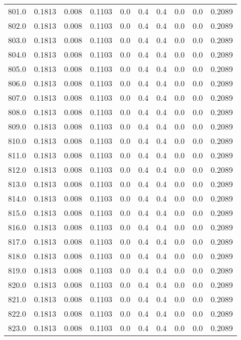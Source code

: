 \begin{longtable}{lrrrrrrrrr}
801.0 & 0.1813 & 0.008 & 0.1103 & 0.0 & 0.4 & 0.4 & 0.0 & 0.0 & 0.2089 \\
802.0 & 0.1813 & 0.008 & 0.1103 & 0.0 & 0.4 & 0.4 & 0.0 & 0.0 & 0.2089 \\
803.0 & 0.1813 & 0.008 & 0.1103 & 0.0 & 0.4 & 0.4 & 0.0 & 0.0 & 0.2089 \\
804.0 & 0.1813 & 0.008 & 0.1103 & 0.0 & 0.4 & 0.4 & 0.0 & 0.0 & 0.2089 \\
805.0 & 0.1813 & 0.008 & 0.1103 & 0.0 & 0.4 & 0.4 & 0.0 & 0.0 & 0.2089 \\
806.0 & 0.1813 & 0.008 & 0.1103 & 0.0 & 0.4 & 0.4 & 0.0 & 0.0 & 0.2089 \\
807.0 & 0.1813 & 0.008 & 0.1103 & 0.0 & 0.4 & 0.4 & 0.0 & 0.0 & 0.2089 \\
808.0 & 0.1813 & 0.008 & 0.1103 & 0.0 & 0.4 & 0.4 & 0.0 & 0.0 & 0.2089 \\
809.0 & 0.1813 & 0.008 & 0.1103 & 0.0 & 0.4 & 0.4 & 0.0 & 0.0 & 0.2089 \\
810.0 & 0.1813 & 0.008 & 0.1103 & 0.0 & 0.4 & 0.4 & 0.0 & 0.0 & 0.2089 \\
811.0 & 0.1813 & 0.008 & 0.1103 & 0.0 & 0.4 & 0.4 & 0.0 & 0.0 & 0.2089 \\
812.0 & 0.1813 & 0.008 & 0.1103 & 0.0 & 0.4 & 0.4 & 0.0 & 0.0 & 0.2089 \\
813.0 & 0.1813 & 0.008 & 0.1103 & 0.0 & 0.4 & 0.4 & 0.0 & 0.0 & 0.2089 \\
814.0 & 0.1813 & 0.008 & 0.1103 & 0.0 & 0.4 & 0.4 & 0.0 & 0.0 & 0.2089 \\
815.0 & 0.1813 & 0.008 & 0.1103 & 0.0 & 0.4 & 0.4 & 0.0 & 0.0 & 0.2089 \\
816.0 & 0.1813 & 0.008 & 0.1103 & 0.0 & 0.4 & 0.4 & 0.0 & 0.0 & 0.2089 \\
817.0 & 0.1813 & 0.008 & 0.1103 & 0.0 & 0.4 & 0.4 & 0.0 & 0.0 & 0.2089 \\
818.0 & 0.1813 & 0.008 & 0.1103 & 0.0 & 0.4 & 0.4 & 0.0 & 0.0 & 0.2089 \\
819.0 & 0.1813 & 0.008 & 0.1103 & 0.0 & 0.4 & 0.4 & 0.0 & 0.0 & 0.2089 \\
820.0 & 0.1813 & 0.008 & 0.1103 & 0.0 & 0.4 & 0.4 & 0.0 & 0.0 & 0.2089 \\
821.0 & 0.1813 & 0.008 & 0.1103 & 0.0 & 0.4 & 0.4 & 0.0 & 0.0 & 0.2089 \\
822.0 & 0.1813 & 0.008 & 0.1103 & 0.0 & 0.4 & 0.4 & 0.0 & 0.0 & 0.2089 \\
823.0 & 0.1813 & 0.008 & 0.1103 & 0.0 & 0.4 & 0.4 & 0.0 & 0.0 & 0.2089 \\

\end{longtable}
